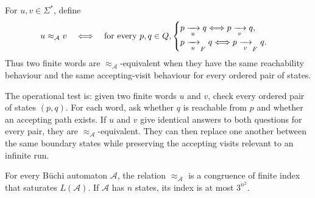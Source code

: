 \begin{definition}
\label{def:approx-a}
For $u,v\in\Sigma^*$, define
\[
  u\approx_{\mathcal A}v
  \quad\Longleftrightarrow\quad
  \text{for every }p,q\in Q,
  \begin{cases}
    p\xrightarrow[{\;u\;}]{}q \Longleftrightarrow p\xrightarrow[{\;v\;}]{}q,\\
    p\xrightarrow[{\;u\;}]{}_{F}q \Longleftrightarrow p\xrightarrow[{\;v\;}]{}_{F}q.
  \end{cases}
\]
Thus two finite words are $\approx_{\mathcal A}$-equivalent when they have the
same reachability behaviour and the same accepting-visit behaviour for
every ordered pair of states.
\end{definition}

The operational test is: given two finite words $u$ and $v$, check every
ordered pair of states $(p,q)$.  For each word, ask whether $q$ is
reachable from $p$ and whether an accepting path exists.  If $u$ and
$v$ give identical answers to both questions for every pair, they are
$\approx_{\mathcal A}$-equivalent.  They can then replace one another between the
same boundary states while preserving the accepting visits relevant to
an infinite run.

\begin{lemma}
\label{lem:approx-a-properties}
For every B\"uchi automaton $\mathcal A$, the relation
$\approx_{\mathcal A}$ is a congruence of finite index that saturates
$L(\mathcal A)$.  If $\mathcal A$ has $n$ states, its index is at most
$3^{n^2}$.
\end{lemma}

